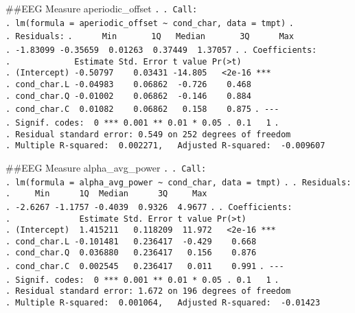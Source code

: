 \documentclass[
]{article}
\begin{document}
\#\#EEG Measure aperiodic\_offset \texttt{.} \texttt{.\ Call:}
\texttt{.\ lm(formula\ =\ aperiodic\_offset\ \textasciitilde{}\ cond\_char,\ data\ =\ tmpt)}
\texttt{.} \texttt{.\ Residuals:}
\texttt{.\ \ \ \ \ \ Min\ \ \ \ \ \ \ 1Q\ \ \ Median\ \ \ \ \ \ \ 3Q\ \ \ \ \ \ Max}
\texttt{.\ -1.83099\ -0.35659\ \ 0.01263\ \ 0.37449\ \ 1.37057}
\texttt{.} \texttt{.\ Coefficients:}
\texttt{.\ \ \ \ \ \ \ \ \ \ \ \ \ Estimate\ Std.\ Error\ t\ value\ Pr(\textgreater{}\textbar{}t\textbar{})}
\texttt{.\ (Intercept)\ -0.50797\ \ \ \ 0.03431\ -14.805\ \ \ \textless{}2e-16\ ***}
\texttt{.\ cond\_char.L\ -0.04983\ \ \ \ 0.06862\ \ -0.726\ \ \ \ 0.468}
\texttt{.\ cond\_char.Q\ -0.01002\ \ \ \ 0.06862\ \ -0.146\ \ \ \ 0.884}
\texttt{.\ cond\_char.C\ \ 0.01082\ \ \ \ 0.06862\ \ \ 0.158\ \ \ \ 0.875}
\texttt{.\ -\/-\/-}
\texttt{.\ Signif.\ codes:\ \ 0\ \textquotesingle{}***\textquotesingle{}\ 0.001\ \textquotesingle{}**\textquotesingle{}\ 0.01\ \textquotesingle{}*\textquotesingle{}\ 0.05\ \textquotesingle{}.\textquotesingle{}\ 0.1\ \textquotesingle{}\ \textquotesingle{}\ 1}
\texttt{.}
\texttt{.\ Residual\ standard\ error:\ 0.549\ on\ 252\ degrees\ of\ freedom}
\texttt{.\ Multiple\ R-squared:\ \ 0.002271,\ \ \ Adjusted\ R-squared:\ \ -0.009607}

\#\#EEG Measure alpha\_avg\_power \texttt{.} \texttt{.\ Call:}
\texttt{.\ lm(formula\ =\ alpha\_avg\_power\ \textasciitilde{}\ cond\_char,\ data\ =\ tmpt)}
\texttt{.} \texttt{.\ Residuals:}
\texttt{.\ \ \ \ \ Min\ \ \ \ \ \ 1Q\ \ Median\ \ \ \ \ \ 3Q\ \ \ \ \ Max}
\texttt{.\ -2.6267\ -1.1757\ -0.4039\ \ 0.9326\ \ 4.9677} \texttt{.}
\texttt{.\ Coefficients:}
\texttt{.\ \ \ \ \ \ \ \ \ \ \ \ \ \ Estimate\ Std.\ Error\ t\ value\ Pr(\textgreater{}\textbar{}t\textbar{})}
\texttt{.\ (Intercept)\ \ 1.415211\ \ \ 0.118209\ \ 11.972\ \ \ \textless{}2e-16\ ***}
\texttt{.\ cond\_char.L\ -0.101481\ \ \ 0.236417\ \ -0.429\ \ \ \ 0.668}
\texttt{.\ cond\_char.Q\ \ 0.036880\ \ \ 0.236417\ \ \ 0.156\ \ \ \ 0.876}
\texttt{.\ cond\_char.C\ \ 0.002545\ \ \ 0.236417\ \ \ 0.011\ \ \ \ 0.991}
\texttt{.\ -\/-\/-}
\texttt{.\ Signif.\ codes:\ \ 0\ \textquotesingle{}***\textquotesingle{}\ 0.001\ \textquotesingle{}**\textquotesingle{}\ 0.01\ \textquotesingle{}*\textquotesingle{}\ 0.05\ \textquotesingle{}.\textquotesingle{}\ 0.1\ \textquotesingle{}\ \textquotesingle{}\ 1}
\texttt{.}
\texttt{.\ Residual\ standard\ error:\ 1.672\ on\ 196\ degrees\ of\ freedom}
\texttt{.\ Multiple\ R-squared:\ \ 0.001064,\ \ \ Adjusted\ R-squared:\ \ -0.01423}
\end{document}
